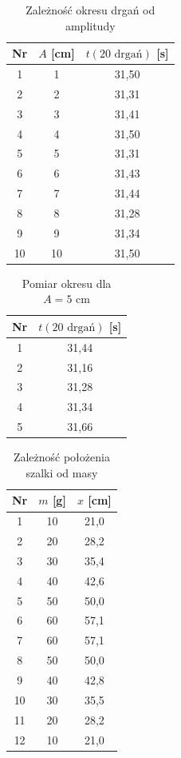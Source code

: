 \documentclass[a4paper,12pt]{article}
\begin{document}
\begin{table}[H]
    \centering
    \begin{tabular}{|c|c|c|}
        \hline
        Nr & $A$ [cm] & $t(20 \text{ drgań})$ [s] \\
        \hline
        1  & 1 & 31,50 \\
        2  & 2 & 31,31 \\
        3  & 3 & 31,41 \\
        4  & 4 & 31,50 \\
        5  & 5 & 31,31 \\
        6  & 6 & 31,43 \\
        7  & 7 & 31,44 \\
        8  & 8 & 31,28 \\
        9  & 9 & 31,34 \\
        10 & 10 & 31,50 \\
        \hline
    \end{tabular}
    \caption{Zależność okresu drgań od amplitudy}
\end{table}

\begin{table}[H]
    \centering
    \begin{tabular}{|c|c|}
        \hline
        Nr & $t(20 \text{ drgań})$ [s] \\
        \hline
        1 & 31,44 \\
        2 & 31,16 \\
        3 & 31,28 \\
        4 & 31,34 \\
        5 & 31,66 \\
        \hline
    \end{tabular}
    \caption{Pomiar okresu dla $A = 5 \text{ cm}$}
\end{table}

\begin{table}[H]
    \centering
    \begin{tabular}{|c|c|c|}
        \hline
        Nr & $m$ [g] & $x$ [cm] \\
        \hline
        1  & 10  & 21,0 \\
        2  & 20  & 28,2 \\
        3  & 30  & 35,4 \\
        4  & 40  & 42,6 \\
        5  & 50  & 50,0 \\
        6  & 60  & 57,1 \\
        \hline
        7  & 60  & 57,1 \\
        8  & 50  & 50,0 \\
        9  & 40  & 42,8 \\
        10 & 30  & 35,5 \\
        11 & 20  & 28,2 \\
        12 & 10  & 21,0 \\
        \hline
    \end{tabular}
    \caption{Zależność położenia szalki od masy}
\end{table}
\end{document}
